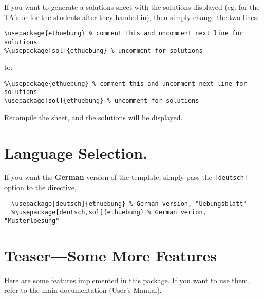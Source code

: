 \documentclass[11pt,a4paper]{article}
\begin{document}
If you want to generate a solutions sheet with the solutions displayed (eg. for the TA's
or for the students after they handed in), then simply change the two lines:
\begin{pkgverbatim}
\begin{verbatim}
\usepackage{ethuebung} % comment this and uncomment next line for solutions
%\usepackage[sol]{ethuebung} % uncomment for solutions
\end{verbatim}
\end{pkgverbatim}
to:
\begin{pkgverbatim}
\begin{verbatim}
%\usepackage{ethuebung} % comment this and uncomment next line for solutions
\usepackage[sol]{ethuebung} % uncomment for solutions
\end{verbatim}
\end{pkgverbatim}

Recompile the sheet, and the solutions will be displayed.


\section*{Language Selection.}

If you want the {\bfseries German} version of the template, simply pass the
\texttt{[deutsch]} option to the  directive,
\begin{pkgverbatim}
\begin{verbatim}
  \usepackage[deutsch]{ethuebung} % German version, "Uebungsblatt"
  %\usepackage[deutsch,sol]{ethuebung} % German verion, "Musterloesung"
\end{verbatim}
\end{pkgverbatim}


\section*{Teaser---Some More Features}

Here are some features implemented in this package. If you want to use them, refer to the
main documentation (User's Manual).
\end{document}
